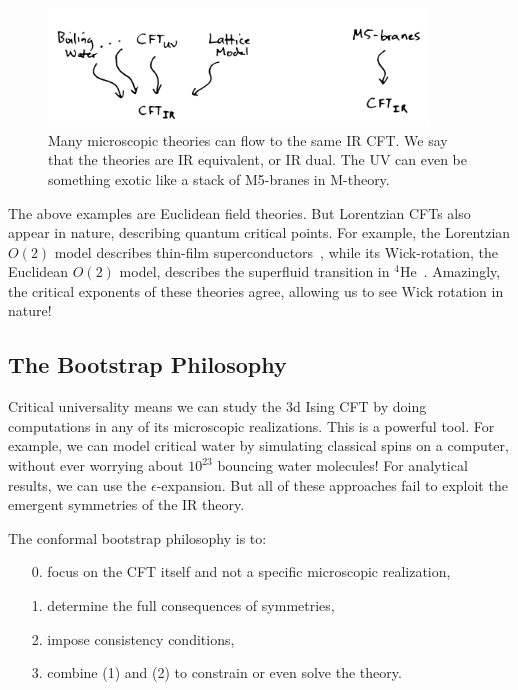 \documentclass{ws-rv9x6}
\newcommand\e\epsilon
\newcommand\<\langle
\renewcommand\>\rangle
\renewcommand\.{\cdot}
\begin{document}
\begin{figure}
\begin{center}
\includegraphics[width=0.9\textwidth]{rgflows.jpg}
\end{center}
\caption{Many  microscopic theories can flow to the same IR CFT\@. We say that the theories are IR equivalent, or IR dual. The UV can even be something exotic like a stack of M5-branes in M-theory. \label{fig:rgflows}}
\end{figure}

The above examples are Euclidean field theories. But Lorentzian CFTs also appear in nature, describing quantum critical points. For example, the Lorentzian $O(2)$ model describes thin-film superconductors~\cite{PhysRevB.44.6883,PhysRevLett.95.180603}, while its Wick-rotation, the Euclidean $O(2)$ model, describes the superfluid transition in ${}^4$He~\cite{Lipa:2003zz}. Amazingly, the critical exponents of these theories agree, allowing us to see Wick rotation in nature!

\subsection{The Bootstrap Philosophy}

Critical universality means we can study the 3d Ising CFT by doing computations in any of its microscopic realizations. This is a powerful tool.  For example, we can model critical water by simulating classical spins on a computer, without ever worrying about $10^{23}$ bouncing water molecules!  For analytical results, we can use the $\e$-expansion.  But all of these approaches fail to exploit the emergent symmetries of the IR theory.

The conformal bootstrap philosophy is to:
\begin{enumerate}
\item[0.] focus on the CFT itself and not a specific microscopic realization,
\item[1.] determine the full consequences of symmetries,
\item[2.] impose consistency conditions,
\item[3.] combine (1) and (2) to constrain or even solve the theory.
\end{enumerate}
\end{document}
